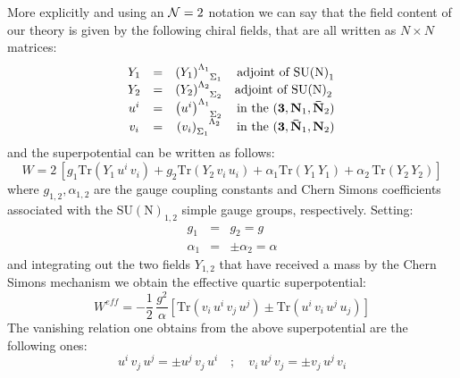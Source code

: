 \documentclass[a4paper,12pt]{article}
\newcommand{\ft}[2]{{\textstyle\frac{#1}{#2}}}
\begin{document}
More explicitly and using an ${\cal N}=2$ notation we can say that
the field content of our theory is given by the following chiral
fields, that are all written as $N \times N$ matrices:
\begin{equation}
  \begin{array}{cccc}
    Y_1 & = & \left(Y_1\right)^{\Lambda_1}_{\phantom{\Lambda_1}\Sigma_1 } &
    \mbox{adjoint of $\mathrm{SU(N)}_1$} \\
   Y_2 & = & \left(Y_2\right)^{\Lambda_2}_{\phantom{\Lambda_2}\Sigma_2}  &
    \mbox{adjoint of $\mathrm{SU(N)}_2$ }\\
     u^i & = & \left(u^i\right)^{\Lambda_1}_{\phantom{\Lambda_1}\Sigma_2 } &
    \mbox{in the $({\bf 3},{\bf N}_1,{\bf \bar N}_2)$} \\
    v_i & = & \left(v_i\right)^{\phantom{\Sigma_1}\Lambda_2}_{\Sigma_1}  &
    \mbox{in the $({\bf 3},{\bf \bar N}_1,{\bf N}_2)$} \\
  \end{array}
\label{matricicole}
\end{equation}
and the superpotential can be written as follows:
\begin{equation}
  W = 2 \, \left [ g_1 \mbox{Tr} \left( Y_1\, u^i \, v_i \right) + g_2
  \mbox{Tr}\left( Y_2\, v_i \, u_i \right) +  \alpha_1 \mbox{Tr}\left(
  Y_1 \, Y_1 \right ) + \alpha_2 \, \mbox{Tr} \left( Y_2 \, Y_2 \right) \right]
\label{suppotmat}
\end{equation}
where $g_{1,2},\alpha_{1,2}$ are the gauge coupling constants and
Chern Simons coefficients associated with
the $\mathrm{SU(N)}_{1,2}$ simple
gauge groups, respectively.
Setting:
\begin{eqnarray}
g_1 & = & g_2 = g\nonumber\\
\alpha_1 & = & \pm \alpha_2 = \alpha
\label{galpha}
\end{eqnarray}
and integrating out the two fields $Y_{1,2}$ that have received a
mass by the Chern Simons mechanism we obtain the effective quartic
superpotential:
\begin{equation}
  W^{eff}= -\ft 1 2 \, \ft {g^2}{\alpha} \left[
  \mbox{Tr} \left( v_i \, u^i \, v_j \, u^j  \right) \pm
  \mbox{Tr} \left( u^i \, v_i \, u^j \, u_j\right)   \right]
\label{effepot}
\end{equation}
The vanishing relation one obtains from the above superpotential are
the following ones:
\begin{equation}
  u^i \, v_j \, u^j = \pm u^j \, v_j \,  u^i \quad ; \quad
   v_i \, u^j \, v_j = \pm v_j \, u^j \,  v_i
\label{vanrel}
\end{equation}
\end{document}
